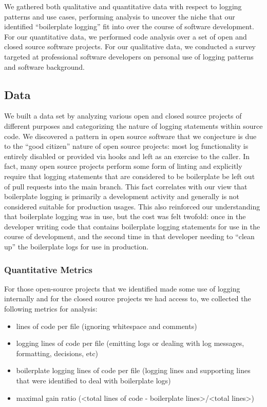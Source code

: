 \documentclass[acmsmall,review,authorversion]{acmart}
\begin{document}
We gathered both qualitative and quantitative data with respect to logging patterns and use cases, performing analysis to uncover the niche that our identified ``boilerplate logging'' fit into over the course of software development. For our quantitative data, we performed code analysis over a set of open and closed source software projects. For our qualitative data, we conducted a survey targeted at professional software developers on personal use of logging patterns and software background.

\subsection{Data}

We built a data set by analyzing various open and closed source projects of different purposes and categorizing the nature of logging statements within source code. We discovered a pattern in open source software that we conjecture is due to the ``good citizen'' nature of open source projects: most log functionality is entirely disabled or provided via hooks and left as an exercise to the caller. In fact, many open source projects perform some form of linting and explicitly require that logging statements that are considered to be boilerplate be left out of pull requests into the main branch. This fact correlates with our view that boilerplate logging is primarily a development activity and generally is not considered suitable for production usages. This also reinforced our understanding that boilerplate logging was in use, but the cost was felt twofold: once in the developer writing code that contains boilerplate logging statements for use in the course of development, and the second time in that developer needing to ``clean up'' the boilerplate logs for use in production.

\subsubsection{Quantitative Metrics}

For those open-source projects that we identified made some use of logging internally and for the closed source projects we had access to, we collected the following metrics for analysis:

\begin{itemize}
    \item lines of code per file (ignoring whitespace and comments)
    \item logging lines of code per file (emitting logs or dealing with log messages, formatting, decisions, etc)
    \item boilerplate logging lines of code per file (logging lines and supporting lines that were identified to deal with boilerplate logs)
    \item maximal gain ratio (<total lines of code - boilerplate lines>/<total lines>)
\end{itemize}
\end{document}
